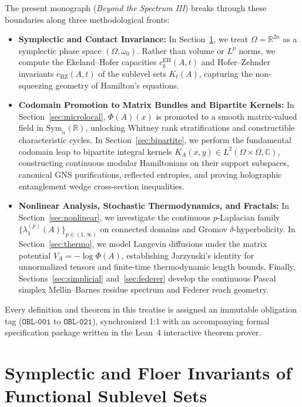 \documentclass[11pt,a4paper,reqno]{amsart}
\theoremstyle{definition}
\theoremstyle{remark}
\numberwithin{equation}{section}
\begin{document}
The present monograph (\emph{Beyond the Spectrum III}) breaks through these boundaries along three methodological fronts:
\begin{itemize}
    \item \textbf{Symplectic and Contact Invariance:} In Section~\ref{sec:symplectic}, we treat $\Omega = \mathbb{R}^{2n}$ as a symplectic phase space $(\Omega, \omega_0)$. Rather than volume or $L^p$ norms, we compute the Ekeland--Hofer capacities $c_k^{\mathrm{EH}}(A, t)$ and Hofer--Zehnder invariants $c_{\mathrm{HZ}}(A, t)$ of the sublevel sets $K_t(A)$, capturing the non-squeezing geometry of Hamilton's equations.
    \item \textbf{Codomain Promotion to Matrix Bundles and Bipartite Kernels:} In Section~\ref{sec:microlocal}, $\Phi(A)(x)$ is promoted to a smooth matrix-valued field in $\mathrm{Sym}_n(\mathbb{R})$, unlocking Whitney rank stratifications and constructible characteristic cycles. In Section~\ref{sec:bipartite}, we perform the fundamental codomain leap to bipartite integral kernels $K_A(x, y) \in L^2(\Omega \times \Omega, \mathbb{C})$, constructing continuous modular Hamiltonians on their support subspaces, canonical GNS purifications, reflected entropies, and proving holographic entanglement wedge cross-section inequalities.
    \item \textbf{Nonlinear Analysis, Stochastic Thermodynamics, and Fractals:} In Section~\ref{sec:nonlinear}, we investigate the continuous $p$-Laplacian family $\{\lambda_1^{(p)}(A)\}_{p \in (1,\infty)}$ on connected domains and Gromov $\delta$-hyperbolicity. In Section~\ref{sec:thermo}, we model Langevin diffusions under the matrix potential $V_A = -\log \Phi(A)$, establishing Jarzynski's identity for unnormalized tensors and finite-time thermodynamic length bounds. Finally, Sections~\ref{sec:simplicial} and~\ref{sec:federer} develop the continuous Pascal simplex Mellin--Barnes residue spectrum and Federer reach geometry.
\end{itemize}

Every definition and theorem in this treatise is assigned an immutable obligation tag ($\mathtt{OBL\text{-}001}$ to $\mathtt{OBL\text{-}021}$), synchronized 1:1 with an accompanying formal specification package written in the Lean~4 interactive theorem prover.

\section{Symplectic and Floer Invariants of Functional Sublevel Sets}
\label{sec:symplectic}
\end{document}
